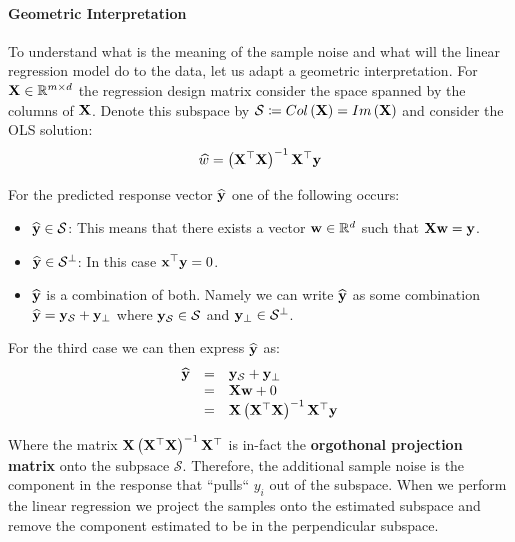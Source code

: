 \paragraph{Geometric Interpretation}
To understand what is the meaning of the sample noise and what will the linear regression model do to the data, let us adapt a geometric interpretation. For $\mathbf{X}\in\mathbb{R}^{m\times d}$ the regression design matrix consider the space spanned by the columns of $\mathbf{X}$. Denote this subspace by $\mathcal{S}\coloneqq Col\left(\mathbf{X}\right) = Im\left(\mathbf{X}\right)$ and consider the OLS solution: $$ \widehat{w} = \left(\mathbf{X}^\top\mathbf{X}\right)^{-1}\mathbf{X}^\top \mathbf{y} $$

For the predicted response vector $\widehat{\mathbf{y}}$ one of the following occurs:
\begin{itemize}
	\item $\widehat{\mathbf{y}}\in\mathcal{S}$: This means that there exists a vector $\mathbf{w}\in\mathbb{R}^d$ such that $\mathbf{X}\mathbf{w} = \mathbf{y}$.
	\item $\widehat{\mathbf{y}}\in\mathcal{S}^\perp$: In this case $\mathbf{x}^\top\mathbf{y}=0$.
	\item $\widehat{\mathbf{y}}$ is a combination of both. Namely we can write $\widehat{\mathbf{y}}$ as some combination $\widehat{\mathbf{y}}=\mathbf{y}_{\mathcal{S}} + \mathbf{y}_\perp$ where $\mathbf{y}_{\mathcal{S}} \in \mathcal{S}$ and $\mathbf{y}_\perp\in\mathcal{S}^\perp$.
\end{itemize}

For the third case we can then express $\widehat{\mathbf{y}}$ as:
\begin{equation}
\begin{array}{ccl}
	\widehat{\mathbf{y}} & =  & \mathbf{y}_{\mathcal{S}} + \mathbf{y}_\perp \\
	& = & \mathbf{X}\mathbf{w} + 0 \\
	& = & \mathbf{X} \left(\mathbf{X}^\top\mathbf{X}\right)^{-1}\mathbf{X}^\top \mathbf{y}
\end{array}
\end{equation}

Where the matrix $\mathbf{X} \left(\mathbf{X}^\top\mathbf{X}\right)^{-1}\mathbf{X}^\top$ is in-fact the \textbf{orgothonal projection matrix} onto the subpsace $\mathcal{S}$. Therefore, the additional sample noise is the component in the response that ``pulls`` $y_i$ out of the subspace. When we perform the linear regression we project the samples onto the estimated subspace and remove the component estimated to be in the perpendicular subspace.  

